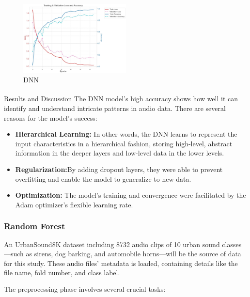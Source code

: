 \documentclass[conference]{IEEEtran}
\begin{document}
\begin{figure}[htbp]
\centerline{\includegraphics[width=0.5\textwidth]{Images/DNNgraph.png}}
\caption{DNN}
\label{fig:DNNgraph}
\end{figure}



\paragraph{}{Results and Discussion}
The DNN model's high accuracy shows how well it can identify and understand intricate patterns in audio data. There are several reasons for the model's success:


\begin{itemize}
    \item \textbf{Hierarchical Learning:} In other words, the DNN learns to represent the input characteristics in a hierarchical fashion, storing high-level, abstract information in the deeper layers and low-level data in the lower levels.

    \item \textbf{Regularization:}By adding dropout layers, they were able to prevent overfitting and enable the model to generalize to new data.

    \item \textbf{Optimization:} The model's training and convergence were facilitated by the Adam optimizer's flexible learning rate.

\end{itemize}

\subsubsection{Random Forest}
An UrbanSound8K dataset including 8732 audio clips of 10 urban sound classes—such as sirens, dog barking, and automobile horns—will be the source of data for this study. These audio files' metadata is loaded, containing details like the file name, fold number, and class label.


The preprocessing phase involves several crucial tasks:
\end{document}

